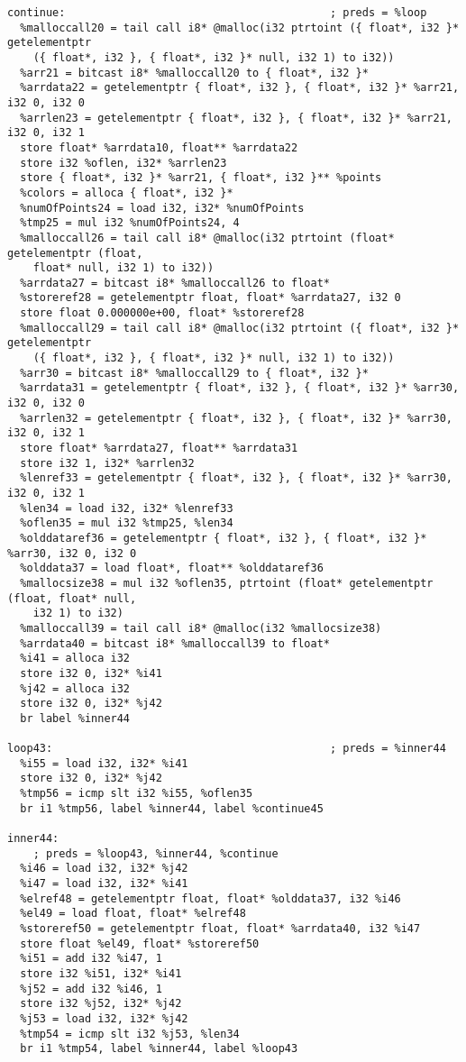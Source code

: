 \documentclass[main.tex]{subfiles}
\begin{document}
{\begin{lstlisting}
continue:                                         ; preds = %loop
  %malloccall20 = tail call i8* @malloc(i32 ptrtoint ({ float*, i32 }* getelementptr
    ({ float*, i32 }, { float*, i32 }* null, i32 1) to i32))
  %arr21 = bitcast i8* %malloccall20 to { float*, i32 }*
  %arrdata22 = getelementptr { float*, i32 }, { float*, i32 }* %arr21, i32 0, i32 0
  %arrlen23 = getelementptr { float*, i32 }, { float*, i32 }* %arr21, i32 0, i32 1
  store float* %arrdata10, float** %arrdata22
  store i32 %oflen, i32* %arrlen23
  store { float*, i32 }* %arr21, { float*, i32 }** %points
  %colors = alloca { float*, i32 }*
  %numOfPoints24 = load i32, i32* %numOfPoints
  %tmp25 = mul i32 %numOfPoints24, 4
  %malloccall26 = tail call i8* @malloc(i32 ptrtoint (float* getelementptr (float,
    float* null, i32 1) to i32))
  %arrdata27 = bitcast i8* %malloccall26 to float*
  %storeref28 = getelementptr float, float* %arrdata27, i32 0
  store float 0.000000e+00, float* %storeref28
  %malloccall29 = tail call i8* @malloc(i32 ptrtoint ({ float*, i32 }* getelementptr
    ({ float*, i32 }, { float*, i32 }* null, i32 1) to i32))
  %arr30 = bitcast i8* %malloccall29 to { float*, i32 }*
  %arrdata31 = getelementptr { float*, i32 }, { float*, i32 }* %arr30, i32 0, i32 0
  %arrlen32 = getelementptr { float*, i32 }, { float*, i32 }* %arr30, i32 0, i32 1
  store float* %arrdata27, float** %arrdata31
  store i32 1, i32* %arrlen32
  %lenref33 = getelementptr { float*, i32 }, { float*, i32 }* %arr30, i32 0, i32 1
  %len34 = load i32, i32* %lenref33
  %oflen35 = mul i32 %tmp25, %len34
  %olddataref36 = getelementptr { float*, i32 }, { float*, i32 }* %arr30, i32 0, i32 0
  %olddata37 = load float*, float** %olddataref36
  %mallocsize38 = mul i32 %oflen35, ptrtoint (float* getelementptr (float, float* null,
    i32 1) to i32)
  %malloccall39 = tail call i8* @malloc(i32 %mallocsize38)
  %arrdata40 = bitcast i8* %malloccall39 to float*
  %i41 = alloca i32
  store i32 0, i32* %i41
  %j42 = alloca i32
  store i32 0, i32* %j42
  br label %inner44

loop43:                                           ; preds = %inner44
  %i55 = load i32, i32* %i41
  store i32 0, i32* %j42
  %tmp56 = icmp slt i32 %i55, %oflen35
  br i1 %tmp56, label %inner44, label %continue45

inner44:                                          
    ; preds = %loop43, %inner44, %continue
  %i46 = load i32, i32* %j42
  %i47 = load i32, i32* %i41
  %elref48 = getelementptr float, float* %olddata37, i32 %i46
  %el49 = load float, float* %elref48
  %storeref50 = getelementptr float, float* %arrdata40, i32 %i47
  store float %el49, float* %storeref50
  %i51 = add i32 %i47, 1
  store i32 %i51, i32* %i41
  %j52 = add i32 %i46, 1
  store i32 %j52, i32* %j42
  %j53 = load i32, i32* %j42
  %tmp54 = icmp slt i32 %j53, %len34
  br i1 %tmp54, label %inner44, label %loop43


\end{lstlisting}}
\end{document}
